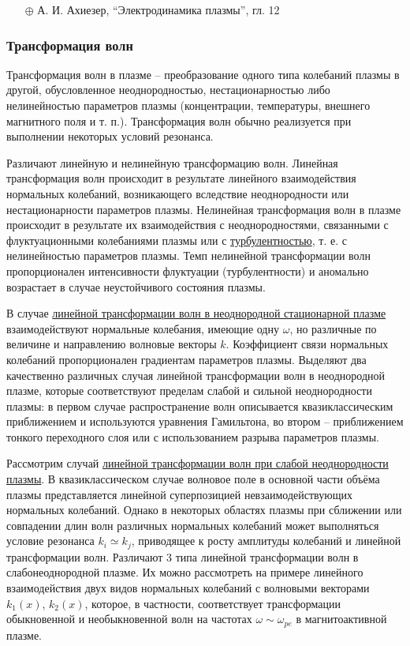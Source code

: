 \documentclass[10pt, a4paper]{article}
\begin{document}
\begin{itemize}
	\item[$\oplus$] А. И. Ахиезер, ``Электродинамика плазмы'', гл. 12
\end{itemize}

\subsubsection{Трансформация волн}

Трансформация волн в плазме -- преобразование одного типа колебаний плазмы в другой, обусловленное неоднородностью, нестационарностью либо нелинейностью параметров плазмы (концентрации, температуры, внешнего магнитного поля и т. п.). Трансформация волн обычно реализуется при выполнении некоторых условий резонанса.

Различают линейную и нелинейную трансформацию волн. Линейная трансформация волн происходит в результате линейного взаимодействия нормальных колебаний, возникающего вследствие неоднородности или нестационарности параметров плазмы. Нелинейная трансформация волн в плазме происходит в результате их взаимодействия с неоднородностями, связанными с флуктуационными колебаниями плазмы или с \uline{турбулентностью}, т. е. с нелинейностью параметров плазмы. Темп нелинейной трансформации волн пропорционален интенсивности флуктуации (турбулентности) и аномально возрастает в случае неустойчивого состояния плазмы.

В случае \uline{линейной трансформации волн в неоднородной стационарной плазме} взаимодействуют нормальные колебания, имеющие одну  $\omega$, но различные по величине и направлению волновые векторы $k$. Коэффициент связи нормальных колебаний пропорционален градиентам параметров плазмы. Выделяют два качественно различных случая линейной трансформации волн в неоднородной плазме, которые соответствуют пределам слабой и сильной неоднородности плазмы: в первом случае распространение волн описывается квазиклассическим приближением и используются уравнения Гамильтона, во втором -- приближением тонкого переходного слоя или с использованием разрыва параметров плазмы.

Рассмотрим случай \uline{линейной трансформации волн при слабой неоднородности плазмы}. В квазиклассическом случае волновое поле в основной части объёма плазмы представляется линейной суперпозицией невзаимодействующих нормальных колебаний. Однако в некоторых областях плазмы при сближении или совпадении длин волн различных нормальных колебаний может выполняться условие резонанса $k_i\simeq k_j$, приводящее к росту амплитуды колебаний и линейной трансформации волн. Различают 3 типа линейной трансформации волн в слабонеоднородной плазме. Их можно рассмотреть на примере линейного взаимодействия двух видов нормальных колебаний с волновыми векторами $k_1(x)$, $k_2(x)$, которое, в частности, соответствует трансформации обыкновенной и необыкновенной волн на частотах $\omega\sim\omega_{pe}$ в магнитоактивной плазме.
\end{document}
